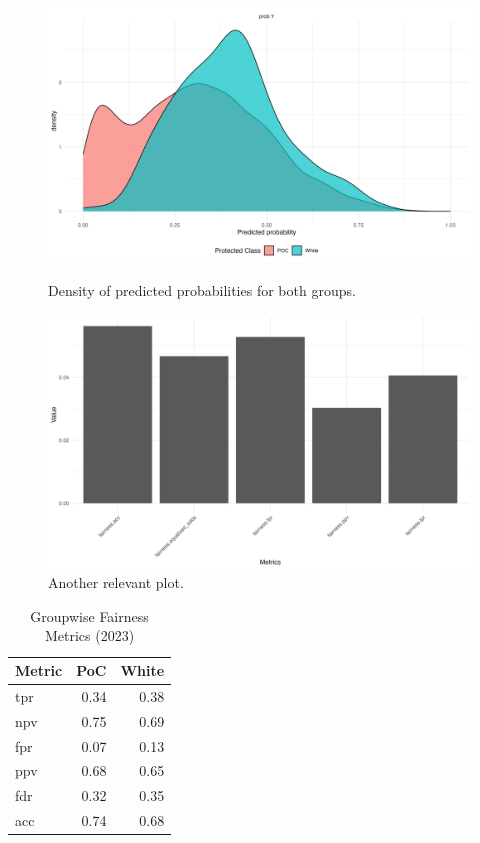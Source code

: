 \begin{figure}
    \centering
    \begin{minipage}{0.48\textwidth}
        \centering
        \includegraphics[width=\textwidth]{../figures/sqf_case_study_plot1.png}
        \caption{Density of predicted probabilities for both groups.}
        \label{fig:fairness_density}
    \end{minipage}
    \hfill
    \begin{minipage}{0.48\textwidth}
        \centering
        \includegraphics[width=\textwidth]{../figures/sqf_case_study_plot2.png}
        \caption{Another relevant plot.}
        \label{fig:fairness_metrics}
    \end{minipage}
\end{figure}

\begin{table}[ht]
  \centering
    \begin{tabular}{lrr}
      \hline
    Metric & PoC & White \\ 
      \hline
    tpr & 0.34 & 0.38 \\ 
      npv & 0.75 & 0.69 \\ 
      fpr & 0.07 & 0.13 \\ 
      ppv & 0.68 & 0.65 \\ 
      fdr & 0.32 & 0.35 \\ 
      acc & 0.74 & 0.68 \\ 
       \hline
    \end{tabular}
  \caption{Groupwise Fairness Metrics (2023)} 
  \label{tab:groupwise_metrics_2023}
\end{table}

